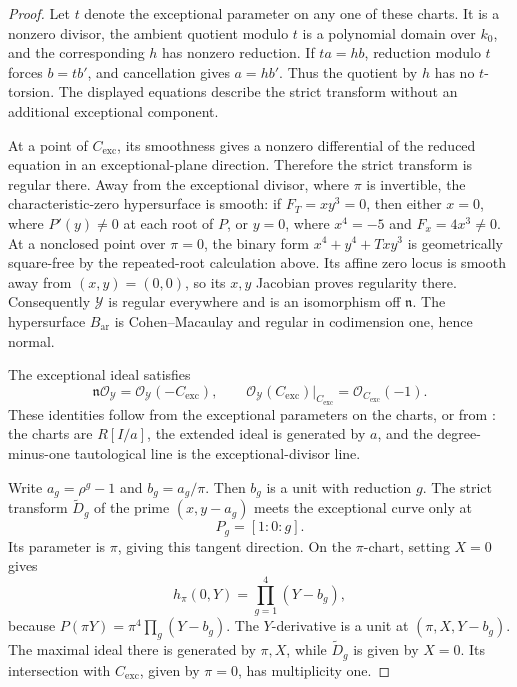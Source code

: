 \documentclass[11pt,a4paper]{amsart}
\numberwithin{equation}{section}
\theoremstyle{definition}
\theoremstyle{remark}
\newcommand{\DtwocO}{\mathcal O}
\newcommand{\DtwocY}{\mathcal Y}
\newcommand{\Dtwofn}{\mathfrak n}
\newcommand{\Dtwowt}{\widetilde}
\newcommand{\Dtwoar}{\mathrm{ar}}
\begin{document}
\begin{proof}
Let \(t\) denote the exceptional parameter on any one of these charts.
It is a nonzero divisor, the ambient quotient modulo \(t\) is a
polynomial domain over \(k_0\), and the corresponding \(h\) has
nonzero reduction. If \(ta=hb\), reduction modulo \(t\) forces
\(b=tb'\), and cancellation gives \(a=hb'\).
Thus the quotient by \(h\) has no \(t\)-torsion.
The displayed equations describe the strict transform without an
additional exceptional component.

At a point of \(C_{\mathrm{exc}}\), its smoothness gives a nonzero
differential of the reduced equation in an exceptional-plane
direction. Therefore the strict transform is regular there.
Away from the exceptional divisor, where \(\pi\) is invertible, the
characteristic-zero hypersurface is smooth: if
\(F_T=xy^3=0\), then either \(x=0\), where \(P'(y)\ne0\) at each
root of \(P\), or \(y=0\), where \(x^4=-5\) and
\(F_x=4x^3\ne0\).
At a nonclosed point over \(\pi=0\), the binary form
\(x^4+y^4+Txy^3\) is geometrically square-free by the repeated-root
calculation above. Its affine zero locus is smooth away from
\((x,y)=(0,0)\), so its \(x,y\) Jacobian proves regularity there.
Consequently \(\DtwocY\) is regular everywhere and is an isomorphism off
\(\Dtwofn\). The hypersurface \(B_{\Dtwoar}\) is Cohen--Macaulay and regular
in codimension one, hence normal.

The exceptional ideal satisfies
\[
 \Dtwofn\DtwocO_{\DtwocY}=\DtwocO_{\DtwocY}(-C_{\mathrm{exc}}),
 \qquad
 \DtwocO_{\DtwocY}(C_{\mathrm{exc}})|_{C_{\mathrm{exc}}}
       =\DtwocO_{C_{\mathrm{exc}}}(-1).
\]
These identities follow from the exceptional parameters on the charts,
or from \cite[Lemmas~31.33.2 and~31.33.4, Tags~0804 and~02OS]{StacksBlowup}:
the charts are \(R[I/a]\), the extended ideal is generated by \(a\),
and the degree-minus-one tautological line is the exceptional-divisor
line.

Write \(a_g=\rho^g-1\) and \(b_g=a_g/\pi\).
Then \(b_g\) is a unit with reduction \(g\).
The strict transform \(\Dtwowt D_g\) of the prime
\((x,y-a_g)\) meets the exceptional curve only at
\[
 P_g=[1:0:g].
\]
Its parameter is \(\pi\), giving this tangent direction.
On the \(\pi\)-chart, setting \(X=0\) gives
\[
 h_\pi(0,Y)=\prod_{g=1}^4(Y-b_g),
\]
because \(P(\pi Y)=\pi^4\prod_g(Y-b_g)\).
The \(Y\)-derivative is a unit at
\((\pi,X,Y-b_g)\).
The maximal ideal there is generated by \(\pi,X\), while
\(\Dtwowt D_g\) is given by \(X=0\).
Its intersection with \(C_{\mathrm{exc}}\), given by \(\pi=0\),
has multiplicity one.


\end{proof}
\end{document}
